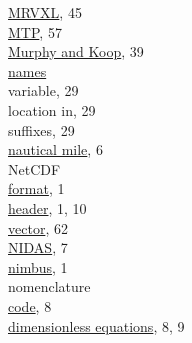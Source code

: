 \documentclass[
]{book}
\begin{document}
\href{./4-the-state-of-the-atmosphere.html\#MR}{MRVXL}, 45\\
\href{./4-the-state-of-the-atmosphere.html\#special-use-remote}{MTP}, 57\\
\href{./4-the-state-of-the-atmosphere.html\#humidity}{Murphy and Koop}, 39\\
\href{./4-the-state-of-the-atmosphere.html\#variable-names}{names}\\
\hspace*{0.333em}\hspace*{0.333em}variable, 29\\
\hspace*{0.333em}\hspace*{0.333em}\hspace*{0.333em}\hspace*{0.333em}location in, 29\\
\hspace*{0.333em}\hspace*{0.333em}\hspace*{0.333em}\hspace*{0.333em}suffixes, 29\\
\href{./2-general-information-about-data-files.html\#units-and-abbreviations}{nautical mile}, 6\\
NetCDF\\
\hspace*{0.333em}\hspace*{0.333em}\href{./introduction.html}{format}, 1\\
\hspace*{0.333em}\hspace*{0.333em}\href{./introduction.html}{header}, 1, 10\\
\hspace*{0.333em}\hspace*{0.333em}\href{./5-cloud-physics-variables.html\#CRPC}{vector}, 62\\
\href{./1-introduction.html}{NIDAS}, 7\\
\href{./1-introduction.html}{nimbus}, 1\\
nomenclature\\
\hspace*{0.333em}\hspace*{0.333em}\href{./2-general-information-about-data-files.html\#variable-names-in-equations}{code}, 8\\
\hspace*{0.333em}\hspace*{0.333em}\href{./2-general-information-about-data-files.html\#dimensions-in-equations}{dimensionless equations}, 8, 9\\
\end{document}
